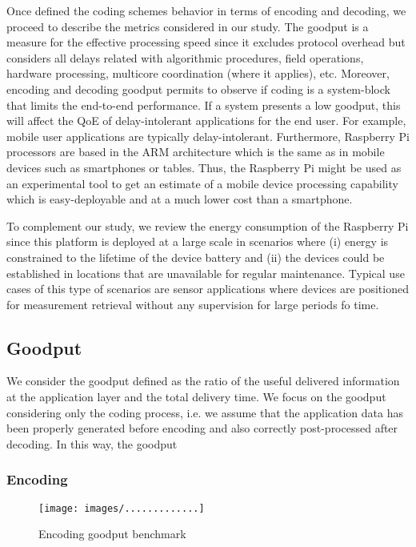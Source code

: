 \label{sec:metrics}

Once defined the coding schemes behavior in terms of encoding
and decoding, we proceed to describe the metrics considered in our study.
The goodput is a measure for the effective processing speed since it
excludes protocol overhead but considers all delays related with
algorithmic procedures, field operations, hardware processing, multicore
coordination (where it applies), etc. Moreover, encoding and decoding
goodput permits to observe if coding is a system-block that limits the
end-to-end performance. If a system presents a low goodput, this will
affect the \ac{QoE} of delay-intolerant applications for the end user.
For example, mobile user applications are typically delay-intolerant.
Furthermore, Raspberry Pi processors are based in the \ac{ARM} architecture
which is the same as in mobile devices such as smartphones or tables.
Thus, the Raspberry Pi might be used as an experimental tool to get an
estimate of a mobile device processing capability which is easy-deployable
and at a much lower cost than a smartphone.

To complement our study, we review the energy consumption of the Raspberry
Pi since this platform is deployed at a large scale in scenarios where (i)
energy is constrained to the lifetime of the device battery and (ii) the
devices could be established in locations that are unavailable for
regular maintenance. Typical use cases of this type of scenarios are
sensor applications where devices are positioned for measurement retrieval
without any supervision for large periods fo time.

\subsection{Goodput}
We consider the goodput defined as the ratio of the useful delivered
information at the application layer and the total delivery time. We focus
on the goodput considering only the coding process, i.e. we assume that
the application data has been properly generated before encoding and
also correctly post-processed after decoding. In this way, the goodput



\subsubsection{Encoding}

\begin{figure}[ht!]
\centering
\texttt{[image: images/.............]}
\caption{Encoding goodput benchmark}
\label{fig:enc_goodput_benchmark}
\end{figure}

